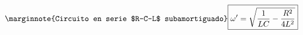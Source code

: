 \begin{equation}\label{30.29}\marginnote{Circuito en serie $R-C-L$ subamortiguado}
\boxed{\omega '=\sqrt{\frac{1}{LC}-\frac{R^2}{4L^2}}}
\end{equation}

















































